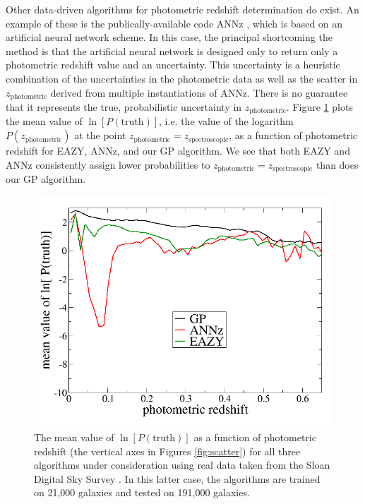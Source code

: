 \documentclass[useAMS,usenatbib,tightenlines,11pt,preprint]{aastex}
\begin{document}
Other data-driven algorithms for photometric redshift determination do exist. 
An example of these is the publically-available code ANNz \cite{annz},
which is based on an artificial neural network scheme.
In this case, the principal
shortcoming the method is that the artificial neural network
is designed only to return only a
photometric redshift value and an uncertainty.
This uncertainty is a heuristic combination of the uncertainties in the
photometric data as well as the scatter in $z_\text{photometric}$ derived
from multiple instantiations of ANNz.  There is no guarantee that it represents
the true, probabilistic uncertainty in $z_\text{photometric}$.
Figure \ref{fig:lnsum} plots the mean value of $\ln[P(\text{truth})]$,
i.e. the value of the logarithm $P(z_\text{photometric})$ at the point
$z_\text{photometric}=z_\text{spectroscopic}$, 
as a function
of photometric redshift for EAZY, ANNz, and our GP algorithm.
We see that both EAZY and ANNz consistently assign lower probabilities to
$z_\text{photometric}=z_\text{spectroscopic}$ than does our GP algorithm.

\begin{figure}
\centerline{\includegraphics[scale=0.3]{sdss_lnsum.png}}
\caption{
The mean value of
$\ln[P(\text{truth})]$ as a function of photometric redshift (the vertical
axes in Figures \ref{fig:scatter}) for all
three algorithms under consideration using real
data taken from the Sloan Digital Sky Survey \cite{Abazajian:2008wr}.  
In this latter case, the
algorithms are trained on 21,000 galaxies and tested on 191,000 galaxies.
}
\label{fig:lnsum}
\end{figure}
\end{document}
